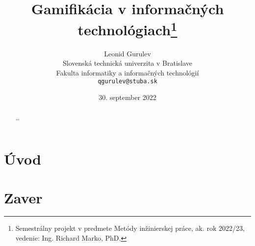 \documentclass[14pt,twoside,a4paper]{article}
\title{Gamifikácia v informačných technológiach\thanks{Semestrálny projekt v predmete Metódy inžinierskej práce, ak. rok 2022/23, vedenie: Ing. Richard Marko, PhD.}}
\author{Leonid Gurulev\\[2pt]
	{\small Slovenská technická univerzita v Bratislave}\\
	{\small Fakulta informatiky a informačných technológií}\\
	{\small \texttt{qgurulev@stuba.sk}}
	}
\date{\small 30. september 2022}
\begin{document}
\maketitle

\begin{abstract}
\ldots
\end{abstract}

\section{Úvod}


\section{Zaver}





\end{document}

